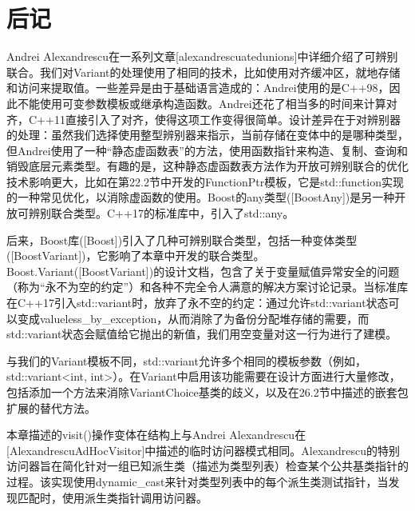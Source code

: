 \section{后记}
Andrei Alexandrescu在一系列文章[alexandrescuatedunions]中详细介绍了可辨别联合。我们对Variant的处理使用了相同的技术，比如使用对齐缓冲区，就地存储和访问来提取值。一些差异是由于基础语言造成的：Andrei使用的是C++98，因此不能使用可变参数模板或继承构造函数。Andrei还花了相当多的时间来计算对齐，C++11直接引入了对齐，使得这项工作变得很简单。设计差异在于对辨别器的处理：虽然我们选择使用整型辨别器来指示，当前存储在变体中的是哪种类型，但Andrei使用了一种“静态虚函数表”的方法，使用函数指针来构造、复制、查询和销毁底层元素类型。有趣的是，这种静态虚函数表方法作为开放可辨别联合的优化技术影响更大，比如在第22.2节中开发的FunctionPtr模板，它是std::function实现的一种常见优化，以消除虚函数的使用。Boost的any类型([BoostAny])是另一种开放可辨别联合类型。C++17的标准库中，引入了std::any。

后来，Boost库([Boost])引入了几种可辨别联合类型，包括一种变体类型([BoostVariant])，它影响了本章中开发的联合类型。Boost.Variant([BoostVariant])的设计文档，包含了关于变量赋值异常安全的问题（称为“永不为空的约定”）和各种不完全令人满意的解决方案讨论记录。当标准库在C++17引入std::variant时，放弃了永不空的约定：通过允许std::variant状态可以变成valueless\_by\_exception，从而消除了为备份分配堆存储的需要，而std::variant状态会赋值给它抛出的新值，我们用空变量对这一行为进行了建模。

与我们的Variant模板不同，std::variant允许多个相同的模板参数（例如，std::variant<int, int>）。在Variant中启用该功能需要在设计方面进行大量修改，包括添加一个方法来消除VariantChoice基类的歧义，以及在26.2节中描述的嵌套包扩展的替代方法。

本章描述的visit()操作变体在结构上与Andrei Alexandrescu在[AlexandrescuAdHocVisitor]中描述的临时访问器模式相同。Alexandrescu的特别访问器旨在简化针对一组已知派生类（描述为类型列表）检查某个公共基类指针的过程。该实现使用dynamic\_cast来针对类型列表中的每个派生类测试指针，当发现匹配时，使用派生类指针调用访问器。



